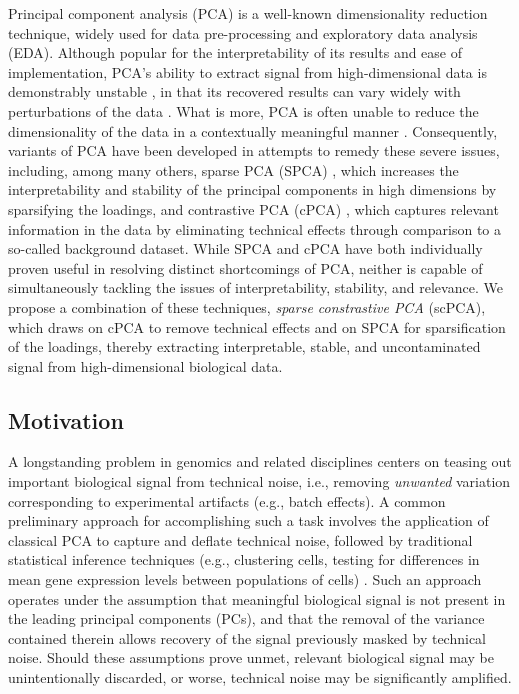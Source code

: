 Principal component analysis (PCA) is a well-known dimensionality reduction technique, widely used for data pre-processing and exploratory data analysis (EDA). Although popular for the interpretability of its results and ease of implementation, PCA's ability to extract signal from high-dimensional data is demonstrably unstable \cite{Shen2013,Johnstone2009}, in that its recovered results can vary widely with perturbations of the data \cite{yu2013}. What is more, PCA is often unable to reduce the dimensionality of the data in a contextually meaningful manner \cite{ringner2008,Abid2018}. Consequently, variants of PCA have been developed in attempts to remedy these severe issues, including, among many others, sparse PCA (SPCA) \cite{Zou2006}, which increases the interpretability and stability of the principal components in high dimensions by sparsifying the loadings, and contrastive PCA (cPCA) \cite{Abid2018}, which captures relevant information in the data by eliminating technical effects through comparison to a so-called background dataset. While SPCA and cPCA have both individually proven useful in resolving distinct shortcomings of PCA, neither is capable of simultaneously tackling the issues of interpretability, stability, and relevance. We propose a combination of these techniques, \textit{sparse constrastive PCA} (scPCA), which draws on cPCA to remove technical effects and on SPCA for sparsification of the loadings, thereby extracting interpretable, stable, and uncontaminated signal from high-dimensional biological data.

\subsection{Motivation}

A longstanding problem in genomics and related disciplines centers on teasing out important biological signal from technical noise, i.e., removing \textit{unwanted} variation corresponding to experimental artifacts (e.g., batch effects). A common preliminary approach for accomplishing such a task involves the application of classical PCA to capture and deflate technical noise, followed by traditional statistical inference techniques (e.g., clustering cells, testing for differences in mean gene expression levels between populations of cells) \cite{Nguyen2019}. Such an approach operates under the assumption that meaningful biological signal is not present in the leading principal components (PCs), and that the removal of the variance contained therein allows recovery of the signal previously masked by technical noise. Should these assumptions prove unmet, relevant biological signal may be unintentionally discarded, or worse, technical noise may be significantly amplified.

